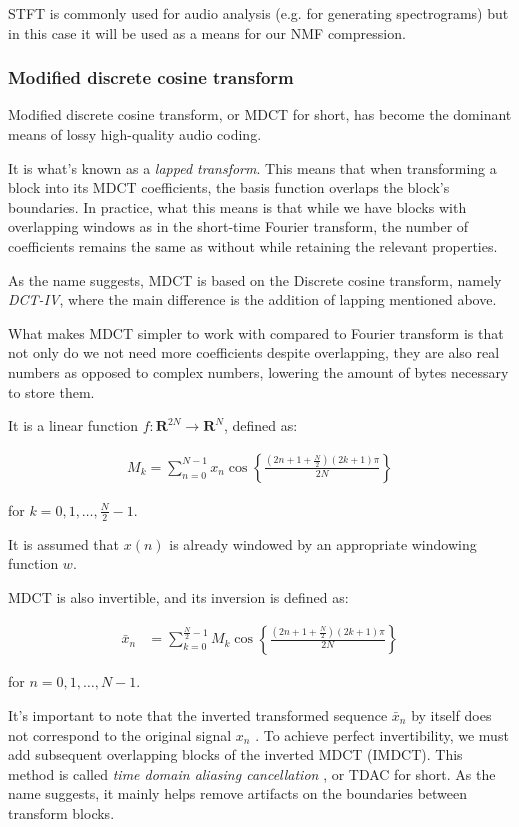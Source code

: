 STFT is commonly used for audio analysis (e.g. for generating spectrograms) but in this case it will be used as a means for our NMF compression.

\subsubsection{Modified discrete cosine transform}
\label{sec:mdct}
Modified discrete cosine transform, or MDCT for short, has become the dominant means of lossy high-quality audio coding. \cite{wang_vilermo_2012_mdct}

It is what's known as a \emph{lapped transform}. This means that when transforming a block into its MDCT coefficients, the basis function overlaps the block's boundaries. \cite{Malvar:1992:SPL:531523} In practice, what this means is that while we have blocks with overlapping windows as in the short-time Fourier transform, the number of coefficients remains the same as without while retaining the relevant properties.

As the name suggests, MDCT is based on the Discrete cosine transform, namely \emph{DCT-IV}, where the main difference is the addition of lapping mentioned above.

What makes MDCT simpler to work with compared to Fourier transform is that not only do we not need more coefficients despite overlapping, they are also real numbers as opposed to complex numbers, lowering the amount of bytes necessary to store them.

It is a linear function $f: \mathbf{R}^{2N} \rightarrow \mathbf{R}^N$, defined as: \cite{Babu2013FastAE}

\begin{align}
M_k = \sum_{n=0}^{N-1} x_n \cos \left\lbrace \frac{(2n+1+ \frac{N}{2} )(2k+1)\pi }{2N} \right\rbrace
\end{align}

for $k = 0, 1, \ldots, \frac{N}{2}-1$.

It is assumed that $x(n)$ is already windowed by an appropriate windowing function $w$.

MDCT is also invertible, and its inversion is defined as:

\begin{align}
\bar{x}_n &= \sum_{k=0}^{\frac{N}{2}-1} M_k \cos \left\lbrace \frac{(2n+1+ \frac{N}{2} )(2k+1)\pi }{2N} \right\rbrace
\end{align}

for $n = 0, 1, \ldots, N-1$.

It's important to note that the inverted transformed sequence $\bar{x}_n$ by itself does not correspond to the original signal $x_n$ \cite{prince_1986_tdac_1}. To achieve perfect invertibility, we must add subsequent overlapping blocks of the inverted MDCT (IMDCT). This method is called \emph{time domain aliasing cancellation} \cite{prince_1986_tdac_2}, or TDAC for short. As the name suggests, it mainly helps remove artifacts on the boundaries between transform blocks.

